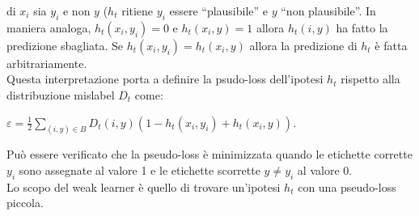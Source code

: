 di \begin{math}x_i\end{math} sia \begin{math}y_i\end{math} e non \begin{math}y\end{math} (\begin{math}h_t\end{math} 
ritiene \begin{math}y_i\end{math} essere ``plausibile'' e \begin{math}y\end{math} ``non plausibile''. 
In maniera analoga, \begin{math}h_t(x_i,y_i)=0\end{math} e \begin{math}h_t(x_i,y)=1\end{math} allora
 \begin{math}h_t(i,y)\end{math} ha fatto la predizione sbagliata. 
Se \begin{math}h_t(x_i,y_i) = h_t(x_i,y)\end{math} allora la predizione di \begin{math}h_t\end{math} \`e 
fatta arbitrariamente.\\
\newline
Questa interpretazione porta a definire la psudo-loss dell'ipotesi \begin{math}h_t\end{math} rispetto alla 
distribuzione mislabel \begin{math}D_t\end{math} come:
\begin{center}
\begin{math}\varepsilon = \frac{1}{2} \sum_{(i,y)\in B}D_t(i,y)(1-h_t(x_i,y_i)+h_t(x_i,y))\end{math}.
\end{center}
Pu\`o essere verificato che la pseudo-loss \`e minimizzata quando le etichette corrette \begin{math}y_i\end{math}
 sono assegnate al valore 1 e le etichette scorrette \begin{math}y\ne y_i\end{math} al valore 0.\\
\newline
Lo scopo del weak learner \`e quello di trovare un'ipotesi \begin{math}h_t\end{math} con una pseudo-loss piccola. 
